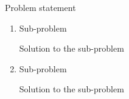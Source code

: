 \item Problem statement 

\begin{enumerate}

\item Sub-problem

\begin{mdframed}

Solution to the sub-problem

\end{mdframed}

\item Sub-problem

\begin{mdframed}

Solution to the sub-problem

\end{mdframed}

\end{enumerate}